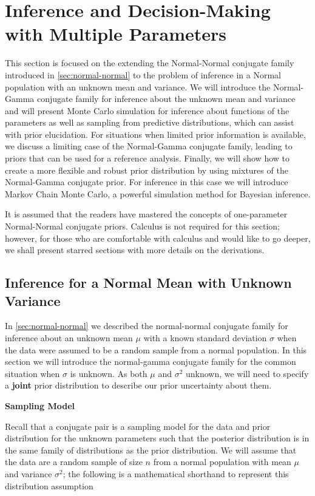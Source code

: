 \documentclass[]{book}
\theoremstyle{definition}
\theoremstyle{definition}
\theoremstyle{remark}
\begin{document}
\section{Inference and Decision-Making with Multiple
Parameters}\label{inference-and-decision-making-with-multiple-parameters}

This section is focused on the extending the Normal-Normal conjugate
family introduced in \ref{sec:normal-normal} to the problem of inference
in a Normal population with an unknown mean and variance. We will
introduce the Normal-Gamma conjugate family for inference about the
unknown mean and variance and will present Monte Carlo simulation for
inference about functions of the parameters as well as sampling from
predictive distributions, which can assist with prior elucidation. For
situations when limited prior information is available, we discuss a
limiting case of the Normal-Gamma conjugate family, leading to priors
that can be used for a reference analysis. Finally, we will show how to
create a more flexible and robust prior distribution by using mixtures
of the Normal-Gamma conjugate prior. For inference in this case we will
introduce Markov Chain Monte Carlo, a powerful simulation method for
Bayesian inference.

It is assumed that the readers have mastered the concepts of
one-parameter Normal-Normal conjugate priors. Calculus is not required
for this section; however, for those who are comfortable with calculus
and would like to go deeper, we shall present starred sections with more
details on the derivations.

\subsection{Inference for a Normal Mean with Unknown
Variance}\label{sec:normal-gamma}

In \ref{sec:normal-normal} we described the normal-normal conjugate
family for inference about an unknown mean \(\mu\) with a known standard
deviation \(\sigma\) when the data were assumed to be a random sample
from a normal population. In this section we will introduce the
normal-gamma conjugate family for the common situation when \(\sigma\)
is unknown. As both \(\mu\) and \(\sigma^2\) unknown, we will need to
specify a \textbf{joint} prior distribution to describe our prior
uncertainty about them.

\textbf{Sampling Model}

Recall that a conjugate pair is a sampling model for the data and prior
distribution for the unknown parameters such that the posterior
distribution is in the same family of distributions as the prior
distribution. We will assume that the data are a random sample of size
\(n\) from a normal population with mean \(\mu\) and variance
\(\sigma^2\); the following is a mathematical shorthand to represent
this distribution assumption
\end{document}
